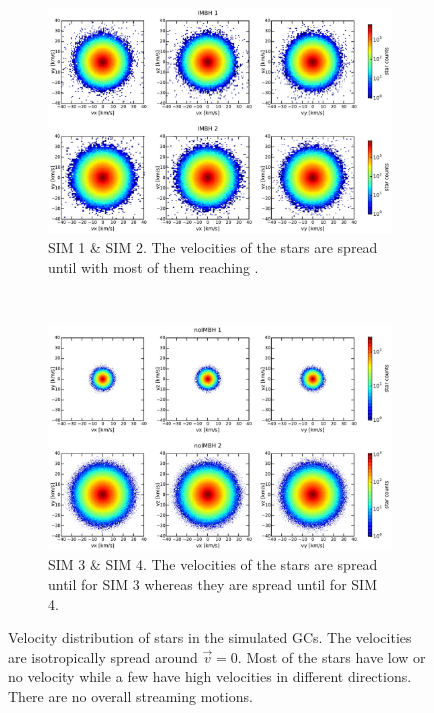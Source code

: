 \begin{figure}[htbp] 
\centering
	\begin{subfigure}{0.8\textwidth}
		\centering
	  	\includegraphics[width=\textwidth]{Plots/velocity_scatter_IMBH.pdf}
	  	\caption{SIM 1 \& SIM 2. The velocities of the stars are spread until  with most of them reaching .}
	 	\label{fig:vel_scat_IMBH}
	\end{subfigure}
	\\
	\begin{subfigure}{0.8\textwidth}
		\centering
	  	\includegraphics[width=\textwidth]{Plots/velocity_scatter_noIMBH.pdf}
	  	\caption{SIM 3 \& SIM 4. The velocities of the stars are spread until  for SIM 3 whereas they  are spread until  for SIM 4.}
	 	\label{fig:vel_scat_noIMBH}
	\end{subfigure}
\caption{Velocity distribution of stars in the simulated \acp{GC}. The velocities are isotropically spread around \(\vec{v}=0\). Most of the stars have low or no velocity while a few have high velocities in different directions. There are no overall streaming motions.}
\label{fig:velocity_scatter}
\end{figure}


